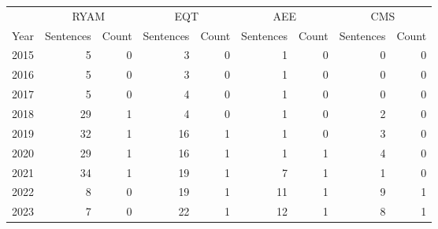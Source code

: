 \begin{tabular}{lrrrrrrrr}
\toprule
 & \multicolumn{2}{c}{RYAM} & \multicolumn{2}{c}{EQT} & \multicolumn{2}{c}{AEE} & \multicolumn{2}{c}{CMS} \\
\cmidrule(lr){2-3}\cmidrule(lr){4-5}\cmidrule(lr){6-7}\cmidrule(lr){8-9}
Year & Sentences & Count & Sentences & Count & Sentences & Count & Sentences & Count \\
\midrule
2015 & 5 & 0 & 3 & 0 & 1 & 0 & 0 & 0 \\
2016 & 5 & 0 & 3 & 0 & 1 & 0 & 0 & 0 \\
2017 & 5 & 0 & 4 & 0 & 1 & 0 & 0 & 0 \\
2018 & 29 & 1 & 4 & 0 & 1 & 0 & 2 & 0 \\
2019 & 32 & 1 & 16 & 1 & 1 & 0 & 3 & 0 \\
2020 & 29 & 1 & 16 & 1 & 1 & 1 & 4 & 0 \\
2021 & 34 & 1 & 19 & 1 & 7 & 1 & 1 & 0 \\
2022 & 8 & 0 & 19 & 1 & 11 & 1 & 9 & 1 \\
2023 & 7 & 0 & 22 & 1 & 12 & 1 & 8 & 1 \\
\bottomrule
\end{tabular}
